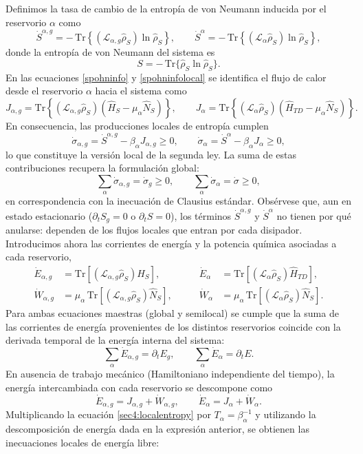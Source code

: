 Definimos la tasa de cambio de la entropía de von Neumann inducida por el reservorio $\alpha$ como
\[
\dot{S}^{\alpha,g}
= -\,\mathrm{Tr}\!\left\{(\mathcal{L}_{\alpha,g}\hat{\rho}_{S})\ln\hat{\rho}_{S}\right\},
\qquad
\dot{S}^{\alpha}
= -\,\mathrm{Tr}\!\left\{(\mathcal{L}_{\alpha}\hat{\rho}_{S})\ln\hat{\rho}_{S}\right\},
\]
donde la entropía de von Neumann del sistema es
\[
S=-\,\mathrm{Tr}\{\hat{\rho}_{S}\ln\hat{\rho}_{S}\}.
\]
En las ecuaciones \eqref{spohninfo} y \eqref{spohninfolocal} se identifica el flujo de calor desde el reservorio $\alpha$ hacia el sistema como
\[
J_{\alpha,g}
=\mathrm{Tr}\!\left\{(\mathcal{L}_{\alpha,g}\hat{\rho}_{S})
(\hat{H}_{S}-\mu_{\alpha}\hat{N}_{S})\right\},
\qquad
J_{\alpha}
=\mathrm{Tr}\!\left\{(\mathcal{L}_{\alpha}\hat{\rho}_{S})
(\hat{H}_{TD}-\mu_{\alpha}\hat{N}_{S})\right\}.
\]
En consecuencia, las producciones locales de entropía cumplen
\begin{equation}
    \dot{\sigma}_{\alpha,g}=\dot{S}^{\alpha,g}-\beta_{\alpha}J_{\alpha,g}\ge 0,
    \qquad
    \dot{\sigma}_{\alpha}=\dot{S}^{\alpha}-\beta_{\alpha}J_{\alpha}\ge 0,
    \label{sec4:localentropy}
\end{equation}
lo que constituye la versión local de la segunda ley. La suma de estas contribuciones recupera la formulación global:
\[
\sum_{\alpha}\dot{\sigma}_{\alpha,g}
=\dot{\sigma}_{g}\ge 0,
\qquad
\sum_{\alpha}\dot{\sigma}_{\alpha}
=\dot{\sigma}\ge 0,
\]
en correspondencia con la inecuación de Clausius estándar. Obsérvese que, aun en estado estacionario
($\partial_{t}S_{g}=0$ o $\partial_{t}S=0$), los términos
$\dot{S}^{\alpha,g}$ y $\dot{S}^{\alpha}$ no tienen por qué anularse: dependen de los flujos locales que entran por cada disipador.
\\

Introducimos ahora las corrientes de energía y la potencia química asociadas a cada reservorio,
\begin{align*}
    \dot{E}_{\alpha,g}
    &= \mathrm{Tr}\!\left[(\mathcal{L}_{\alpha,g}\hat{\rho}_{S})\hat{H}_{S}\right],
    &\qquad
    \dot{E}_{\alpha}
    &= \mathrm{Tr}\!\left[(\mathcal{L}_{\alpha}\hat{\rho}_{S})\hat{H}_{TD}\right],\\[2pt]
    \dot{W}_{\alpha,g}
    &= \mu_{\alpha}\,\mathrm{Tr}\!\left[(\mathcal{L}_{\alpha,g}\hat{\rho}_{S})\hat{N}_{S}\right],
    &\qquad
    \dot{W}_{\alpha}
    &= \mu_{\alpha}\,\mathrm{Tr}\!\left[(\mathcal{L}_{\alpha}\hat{\rho}_{S})\hat{N}_{S}\right].
\end{align*}
Para ambas ecuaciones maestras (global y semilocal) se cumple que la suma de las corrientes de energía provenientes de los distintos reservorios coincide con la derivada temporal de la energía interna del sistema:
\[
\sum_{\alpha}\dot{E}_{\alpha,g}=\partial_{t}E_{g},
\qquad
\sum_{\alpha}\dot{E}_{\alpha}=\partial_{t}E.
\]
En ausencia de trabajo mecánico (Hamiltoniano independiente del tiempo), la energía intercambiada con cada reservorio se descompone como
\[
\dot{E}_{\alpha,g}=J_{\alpha,g}+\dot{W}_{\alpha,g},
\qquad
\dot{E}_{\alpha}=J_{\alpha}+\dot{W}_{\alpha}.
\]
Multiplicando la ecuación \eqref{sec4:localentropy} por $T_{\alpha}=\beta_{\alpha}^{-1}$ y utilizando la descomposición de energía dada en la expresión anterior, se obtienen las inecuaciones locales de energía libre:

